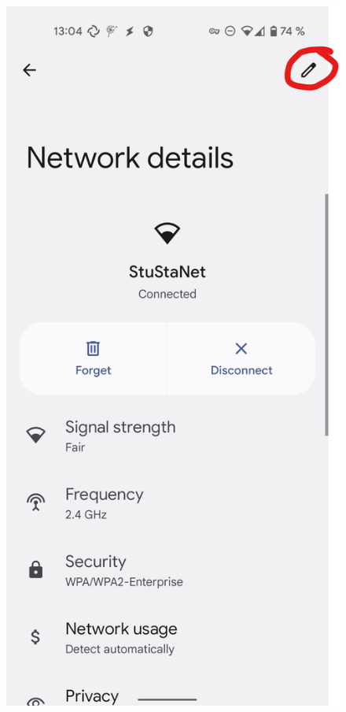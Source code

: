 \documentclass[a4paper,12pt]{scrartcl}
\begin{document}
\begin{figure}[h]
\begin{minipage}{0.20\textwidth}
		\includegraphics[width=0.7\linewidth,keepaspectratio]{Bilder/Android/android12_2}
	\end{minipage}
	\begin{minipage}{0.20\textwidth}

\end{minipage}
\end{figure}
\end{document}
